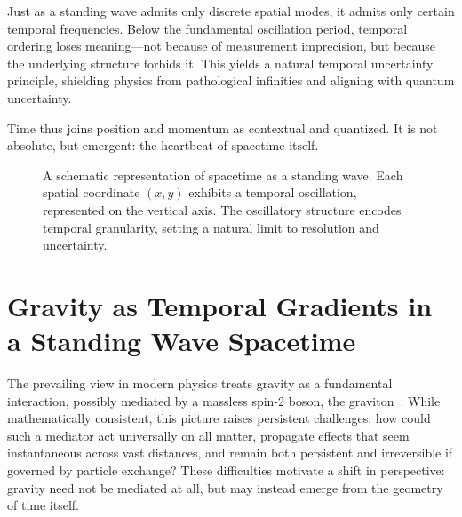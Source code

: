 \documentclass[12pt]{article}
\begin{document}
Just as a standing wave admits only discrete spatial modes, it admits only certain temporal frequencies. Below the fundamental oscillation period, temporal ordering loses meaning---not because of measurement imprecision, but because the underlying structure forbids it. This yields a natural temporal uncertainty principle, shielding physics from pathological infinities and aligning with quantum uncertainty.

Time thus joins position and momentum as contextual and quantized. It is not absolute, but emergent: the heartbeat of spacetime itself.

\begin{figure}[H]
  \centering
  \caption{A schematic representation of spacetime as a standing wave. Each spatial coordinate $(x,y)$ exhibits a temporal oscillation, represented on the vertical axis. The oscillatory structure encodes temporal granularity, setting a natural limit to resolution and uncertainty.}
  \label{fig:standing_wave_oscillation}
\end{figure}


\section{Gravity as Temporal Gradients in a Standing Wave Spacetime}

The prevailing view in modern physics treats gravity as a fundamental interaction, possibly mediated by a massless spin-2 boson, the graviton~\cite{Feynman1963,Weinberg1965,wikipediaGraviton}. While mathematically consistent, this picture raises persistent challenges: how could such a mediator act universally on all matter, propagate effects that seem instantaneous across vast distances, and remain both persistent and irreversible if governed by particle exchange? These difficulties motivate a shift in perspective: gravity need not be mediated at all, but may instead emerge from the geometry of time itself.
\end{document}
